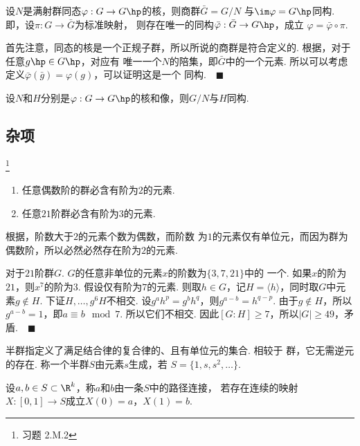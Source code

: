   \begin{thm}[群同构第一定理]
    设$N$是满射群同态$\varphi:G\to G\hp$的核，则商群$\bar{G}=G/N$
    与$\im\varphi=G\hp$同构. 即，设$\pi:G\to\bar{G}$为标准映射，
    则存在唯一的同构$\bar{\varphi}:\bar{G}\to G\hp$，成立
    $\varphi = \bar{\varphi}\circ\pi$.
  \end{thm}
  \proof
    首先注意，同态的核是一个正规子群，所以所说的商群是符合定义的.
    根据，对于任意$g\hp\in G\hp$，对应有
    唯一一个$N$的陪集，即$\bar{G}$中的一个元素. 所以可以考虑
    定义$\bar{\varphi}(\bar{g})=\varphi(g)$，可以证明这是一个
    同构.$\quad\blacksquare$

  \begin{cor}
    设$N$和$H$分别是$\varphi:G\to G\hp$的核和像，则$G/N$与$H$同构.
  \end{cor}

\subsection{杂项}

  \begin{pos}
    \footnote{习题 2.M.2}
    $\,$
    \begin{enumerate}
      \item 任意偶数阶的群必含有阶为$2$的元素.
      \item 任意$21$阶群必含有阶为$3$的元素.
    \end{enumerate}
  \end{pos}
  \proof
    根据，阶数大于$2$的元素个数为偶数，而阶数
    为$1$的元素仅有单位元，而因为群为偶数阶，所以必然必然存在阶为$2$的元素.
    \par
    对于$21$阶群$G$. $G$的任意非单位的元素$x$的阶数为$\{3,7,21\}$中的
    一个. 如果$x$的阶为$21$，则$x^7$的阶为$3$. 假设仅有阶为$7$的元素.
    则取$h\in G$，记$H=\langle h\rangle$，同时取$G$中元素$g\notin H$.
    下证$H,\dots,g^6H$不相交. 设$g^ah^p  = g^bh^q$，则$g^{a-b}=h^{q-p}$.
    由于$g\notin H$，所以$g^{a-b}=1$，即$a\equiv b\mod 7$. 所以它们不相交.
    因此$[G:H]\ge 7$，所以$|G|\ge 49$，矛盾.$\quad\blacksquare$

  \begin{defi}[半群]
    半群指定义了满足结合律的复合律的、且有单位元的集合. 相较于
    群，它无需逆元的存在. 称一个半群$S$由元素$s$生成，若
    $S=\{1, s, s^2, \dots\}$.
  \end{defi}

  \begin{defi}
    \label{defi: 路径连接}
    设$a,b\in S\subset\R^k$，称$a$和$b$由一条$S$中的路径连接，
    若存在连续的映射$X:[0,1]\to S$成立$X(0)=a$，$X(1)=b$.
  \end{defi}



